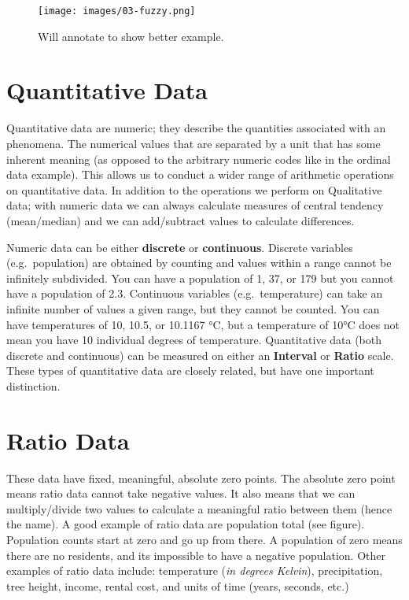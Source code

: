 \documentclass[
]{book}
\begin{document}
\begin{figure}
\centering
\texttt{[image: images/03-fuzzy.png]}
\caption{Will annotate to show better example.}
\end{figure}

\hypertarget{quantitative-data}{%
\section{Quantitative Data}\label{quantitative-data}}

Quantitative data are numeric; they describe the quantities associated with an phenomena. The numerical values that are separated by a unit that has some inherent meaning (as opposed to the arbitrary numeric codes like in the ordinal data example). This allows us to conduct a wider range of arithmetic operations on quantitative data. In addition to the operations we perform on Qualitative data; with numeric data we can always calculate measures of central tendency (mean/median) and we can add/subtract values to calculate differences.

Numeric data can be either \textbf{discrete} or \textbf{continuous}. Discrete variables (e.g.~population) are obtained by counting and values within a range cannot be infinitely subdivided. You can have a population of 1, 37, or 179 but you cannot have a population of 2.3. Continuous variables (e.g.~temperature) can take an infinite number of values a given range, but they cannot be counted. You can have temperatures of 10, 10.5, or 10.1167 °C, but a temperature of 10°C does not mean you have 10 individual degrees of temperature. Quantitative data (both discrete and continuous) can be measured on either an \textbf{Interval} or \textbf{Ratio} scale. These types of quantitative data are closely related, but have one important distinction.

\hypertarget{ratio-data}{%
\section{Ratio Data}\label{ratio-data}}

These data have fixed, meaningful, absolute zero points. The absolute zero point means ratio data cannot take negative values. It also means that we can multiply/divide two values to calculate a meaningful ratio between them (hence the name). A good example of ratio data are population total (see figure). Population counts start at zero and go up from there. A population of zero means there are no residents, and its impossible to have a negative population. Other examples of ratio data include: temperature (\emph{in degrees Kelvin}), precipitation, tree height, income, rental cost, and units of time (years, seconds, etc.)
\end{document}
